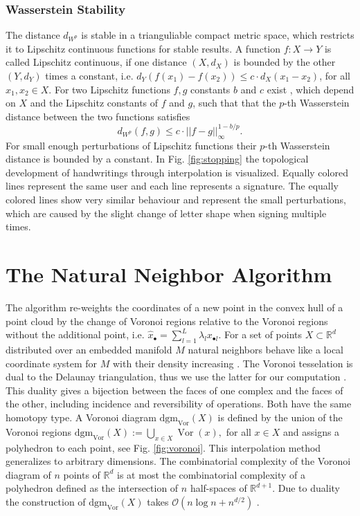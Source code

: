 \documentclass[runningheads]{llncs}
\DeclareMathOperator{\Vor}{\text{Vor}}
\begin{document}
\subsubsection{Wasserstein Stability}
The distance $d_{W^p}$ is stable in a trianguliable compact metric space, which restricts it to Lipschitz continuous functions for stable results. A function $f: X \rightarrow Y$ is called Lipschitz continuous, if one distance $(X,d_X)$ is bounded by the other $(Y,d_Y)$ times a constant, i.e. $d_Y(f(x_1) - f(x_2)) \leq c \cdot d_X(x_1-x_2)$, for all $x_1, x_2 \in X.$ For two Lipschitz functions $f,g$ constants $b$ and $c$ exist \cite{cohen2010lipschitz}, which depend on $X$ and the Lipschitz constants of $f$ and $g$, such that that the $p$-th Wasserstein distance between the two functions satisfies
\begin{equation}
  d_{W^p}(f,g) \leq c \cdot ||f-g||_\infty^{1-b/p}.
\end{equation}
For small enough perturbations of Lipschitz functions their $p$-th Wasserstein distance is bounded by a constant. In Fig. \ref{fig:stopping} the topological development of handwritings through interpolation is visualized. Equally colored lines represent the same user and each line represents a signature. The equally colored lines show very similar behaviour and represent the small perturbations, which are caused by the slight change of letter shape when signing multiple times.

\section{The Natural Neighbor Algorithm}
\label{sec:natneighbor}

The algorithm re-weights the coordinates of a new point in the convex hull of a point cloud by the change of Voronoi regions relative to the Voronoi regions without the additional point, i.e. $\hat{x}_{\bullet} = \sum_{l=1}^{L} \lambda_l x_{\bullet l}$. For a set of points $X \subset \mathbb{R}^d$ distributed over an embedded manifold $M$ natural neighbors behave like a local coordinate system for $M$ with their density increasing \cite{BoissonnatC01}. The Voronoi tesselation is dual to the Delaunay triangulation, thus we use the latter for our computation \cite[pp.~45-47]{BoissonnatDG18}. This duality gives a bijection between the faces of one complex and the faces of the other, including incidence and reversibility of operations. Both have the same homotopy type. A Voronoi diagram $\text{dgm}_{\Vor}(X)$ is defined by the union of the Voronoi regions $\text{dgm}_{\Vor}(X) := \bigcup_{x \in X} \Vor(x),$ for all $x \in X$ and assigns a polyhedron to each point, see Fig. \ref{fig:voronoi}. This interpolation method generalizes to arbitrary dimensions. The combinatorial complexity of the Voronoi diagram of $n$ points of $\mathbb{R}^d$ is at most the combinatorial complexity of a polyhedron defined as the intersection of $n$ half-spaces of $\mathbb{R}^{d+1}$. Due to duality the construction of $\text{dgm}_{\Vor}(X)$ takes $\mathcal{O}( n \log n+n^{d/2})$  \cite{BoissonnatDG18}.
\end{document}
